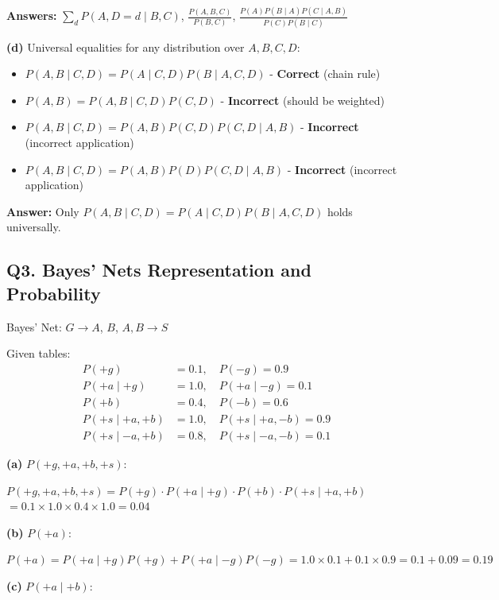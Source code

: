 \documentclass[11pt]{article}
\begin{document}
\textbf{Answers:} $\boxed{\sum_d P(A, D = d \mid B, C)}$, $\boxed{\frac{P(A, B, C)}{P(B, C)}}$, $\boxed{\frac{P(A) P(B \mid A) P(C \mid A, B)}{P(C) P(B \mid C)}}$

\textbf{(d)} Universal equalities for any distribution over $A, B, C, D$:

\begin{itemize}
\item $P(A, B \mid C, D) = P(A \mid C, D) P(B \mid A, C, D)$ - \textbf{Correct} (chain rule)
\item $P(A, B) = P(A, B \mid C, D) P(C, D)$ - \textbf{Incorrect} (should be weighted)
\item $P(A, B \mid C, D) = P(A, B) P(C, D) P(C, D \mid A, B)$ - \textbf{Incorrect} (incorrect application)
\item $P(A, B \mid C, D) = P(A, B) P(D) P(C, D \mid A, B)$ - \textbf{Incorrect} (incorrect application)
\end{itemize}

\textbf{Answer:} Only $\boxed{P(A, B \mid C, D) = P(A \mid C, D) P(B \mid A, C, D)}$ holds universally.

\subsection*{Q3. Bayes' Nets Representation and Probability}

Bayes' Net: $G \to A$, $B$, $A, B \to S$

Given tables:
\begin{align}
P(+g) &= 0.1, \quad P(-g) = 0.9 \\
P(+a \mid +g) &= 1.0, \quad P(+a \mid -g) = 0.1 \\
P(+b) &= 0.4, \quad P(-b) = 0.6 \\
P(+s \mid +a, +b) &= 1.0, \quad P(+s \mid +a, -b) = 0.9 \\
P(+s \mid -a, +b) &= 0.8, \quad P(+s \mid -a, -b) = 0.1
\end{align}

\textbf{(a)} $P(+g, +a, +b, +s)$:

$P(+g, +a, +b, +s) = P(+g) \cdot P(+a \mid +g) \cdot P(+b) \cdot P(+s \mid +a, +b)$
$= 0.1 \times 1.0 \times 0.4 \times 1.0 = \boxed{0.04}$

\textbf{(b)} $P(+a)$:

$P(+a) = P(+a \mid +g) P(+g) + P(+a \mid -g) P(-g) = 1.0 \times 0.1 + 0.1 \times 0.9 = 0.1 + 0.09 = \boxed{0.19}$

\textbf{(c)} $P(+a \mid +b)$:
\end{document}
